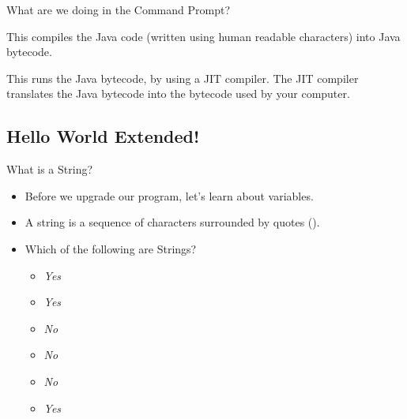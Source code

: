 \begin{frame}[fragile]{What are we doing in the Command Prompt?}
\begin{semiverbatim}\end{semiverbatim}
\begin{center}
This compiles the Java code (written using human readable characters) into Java bytecode.
\end{center}

\pause
\begin{semiverbatim}\end{semiverbatim}
\begin{center}
This runs the Java bytecode, by using a JIT compiler. The JIT compiler translates the Java bytecode into the bytecode used by your computer.
\end{center}
\end{frame}

\subsection{Hello World Extended!}
\begin{frame}{What is a String?}
\begin{itemize}
\item Before we upgrade our program, let's learn about variables.
\item A string is a sequence of characters surrounded by quotes (). \pause
\item Which of the following are Strings?
\begin{itemize}
\item {} \pause \emph{Yes}
\item {} \pause \emph{Yes}
\item {} \pause \emph{No}
\item {} \pause \emph{No}
\item {} \pause \emph{No}
\item {} \pause \emph{Yes}
\end{itemize}

\end{itemize}
\end{frame}


